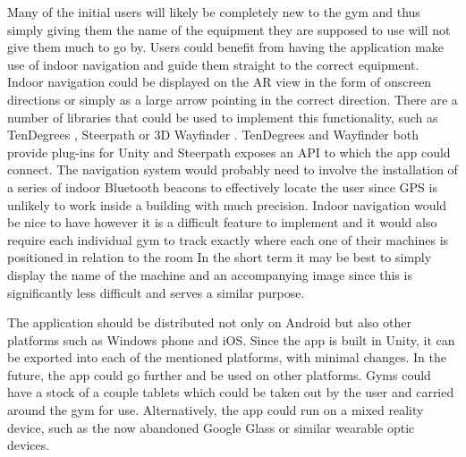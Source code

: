 \documentclass{l4proj}
\begin{document}
Many of the initial users will likely be completely new to the gym and thus simply giving them the name of the equipment they are supposed to use will not give them much to go by. Users could benefit from having the application make use of indoor navigation and guide them straight to the correct equipment. Indoor navigation could be displayed on the AR view in the form of onscreen directions or simply as a large arrow pointing in the correct direction. There are a number of libraries that could be used to implement this functionality, such as TenDegrees \cite{ten_degrees_ten_nodate}, Steerpath \cite{steerpath_indoor_nodate} or 3D Wayfinder \cite{3d_wayfinder_interactive_nodate}. TenDegrees and Wayfinder both provide plug-ins for Unity and Steerpath exposes an API to which the app could connect. The navigation system would probably need to involve the installation of a series of indoor Bluetooth beacons to effectively locate the user since GPS is unlikely to work inside a building with much precision. Indoor navigation would be nice to have however it is a difficult feature to implement and it would also require each individual gym to track exactly where each one of their machines is positioned in relation to the room In the short term it may be best to simply display the name of the machine and an accompanying image since this is significantly less difficult and serves a similar purpose. 


The application should be distributed not only on Android but also other platforms such as Windows phone and iOS. Since the app is built in Unity, it can be exported into each of the mentioned platforms, with minimal changes. In the future, the app could go further and be used on other platforms. Gyms could have a stock of a couple tablets which could be taken out by the user and carried around the gym for use. Alternatively, the app could run on a mixed reality device, such as the now abandoned Google Glass or similar wearable optic devices. 
\end{document}

